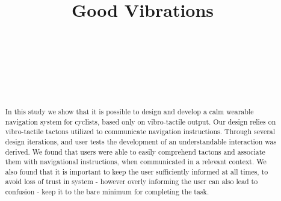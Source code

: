 \documentclass{sigchi}
\def\plaintitle{Good Vibrations}
\begin{document}
\title{\plaintitle}

\author{%
  \\
  \\
  \\
  \\
  \\
}

\maketitle

\begin{abstract}
In this study we show that it is possible to design and develop a calm wearable navigation system for cyclists, based only on vibro-tactile output. Our design relies on vibro-tactile tactons utilized to communicate navigation instructions. Through several design iterations, and user tests the development of an understandable interaction was derived. We found that users were able to easily comprehend tactons and associate them with navigational instructions, when communicated in a relevant context. We also found that it is important to keep the user sufficiently informed at all times, to avoid loss of trust in system - however overly informing the user can also lead to confusion - keep it to the bare minimum for completing the task.
\end{abstract}
\end{document}
